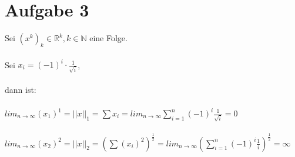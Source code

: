 \documentclass{llncs}
\begin{document}
\section*{Aufgabe 3}

Sei $(x^k)_{k} \in \mathbb{R}^k, k \in \mathbb{N}$ eine Folge.\\
\\
Sei $x_i = (-1)^i \cdot \frac{1}{\sqrt{i}}$,\\
\\
dann ist:\\
\\
$lim_{n \rightarrow \infty} (x_1)^1 = ||x||_1 = \sum x_i = lim_{n \rightarrow \infty} \sum_{i=1}^{n} (-1)^i \frac{1}{\sqrt{i}} = 0$\\
\\
$lim_{n \rightarrow \infty} (x_2)^2 = ||x||_2 = (\sum (x_i)^2)^{\frac{1}{2}} = lim_{n \rightarrow \infty} (\sum_{i=1}^{n} (-1)^i \frac{1}{i})^{\frac{1}{2}} = \infty$
\end{document}
